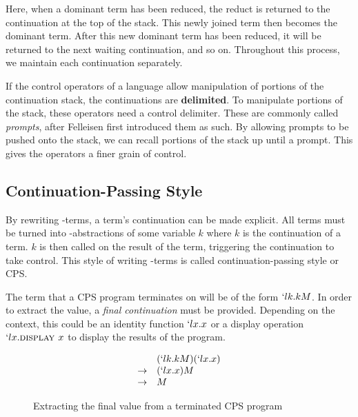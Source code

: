   Here, when a dominant term has been reduced, 
  the reduct is returned to the continuation at the top of the stack. 
  This newly joined term then becomes the dominant term. 
  After this new dominant term has been reduced, 
  it will be returned to the next waiting continuation, and so on. 
  Throughout this process, we maintain each continuation separately.

  If the control operators of a language allow manipulation of portions of the continuation stack,
  the continuations are \textbf{delimited}.
  To manipulate portions of the stack, these operators need a control delimiter.
  These are commonly called \emph{prompts}, after Felleisen first introduced them as such.
  By allowing prompts to be pushed onto the stack, we can recall portions of the stack up until a prompt.
  This gives the operators a finer grain of control.

  \subsection{Continuation-Passing Style}
 
  By rewriting \lam-terms, a term's continuation can be made explicit. All
  terms must be turned into \lam-abstractions of some variable $k$
  where $k$ is the continuation of a term. $k$ is then called on the
  result of the term, triggering the continuation to take control.
  This style of writing \lam-terms is called continuation-passing
  style or CPS.
  
  
  The term that a CPS program terminates on will be of the form
  $`lk.kM$. In order to extract the value, a \emph{final continuation}
  must be provided. Depending on the context, this could be an identity 
  function $`lx.x$ or a display operation $`lx.\textsc{display }x$ to
  display the results of the program.

  \begin{figure}[!h]
  \caption{Extracting the final value from a terminated CPS program}
  \[
  \begin{array}{ll}
                & (`lk.kM)(`lx.x) \\
    \rightarrow & (`lx.x)M \\
    \rightarrow & M
  \end{array}
  \]
  \end{figure}
 

